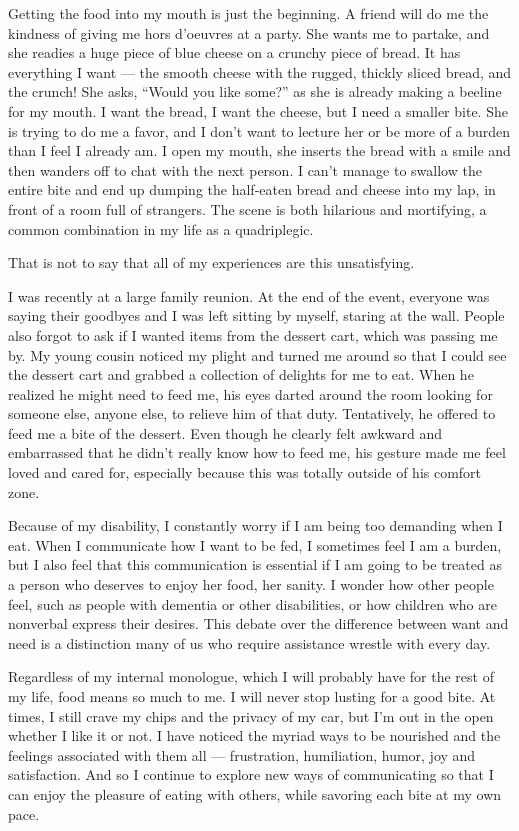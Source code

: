 Getting the food into my mouth is just the beginning. A friend will do
me the kindness of giving me hors d'oeuvres at a party. She wants me to
partake, and she readies a huge piece of blue cheese on a crunchy piece
of bread. It has everything I want --- the smooth cheese with the
rugged, thickly sliced bread, and the crunch! She asks, ``Would you like
some?'' as she is already making a beeline for my mouth. I want the
bread, I want the cheese, but I need a smaller bite. She is trying to do
me a favor, and I don't want to lecture her or be more of a burden than
I feel I already am. I open my mouth, she inserts the bread with a smile
and then wanders off to chat with the next person. I can't manage to
swallow the entire bite and end up dumping the half-eaten bread and
cheese into my lap, in front of a room full of strangers. The scene is
both hilarious and mortifying, a common combination in my life as a
quadriplegic.

That is not to say that all of my experiences are this unsatisfying.

I was recently at a large family reunion. At the end of the event,
everyone was saying their goodbyes and I was left sitting by myself,
staring at the wall. People also forgot to ask if I wanted items from
the dessert cart, which was passing me by. My young cousin noticed my
plight and turned me around so that I could see the dessert cart and
grabbed a collection of delights for me to eat. When he realized he
might need to feed me, his eyes darted around the room looking for
someone else, anyone else, to relieve him of that duty. Tentatively, he
offered to feed me a bite of the dessert. Even though he clearly felt
awkward and embarrassed that he didn't really know how to feed me, his
gesture made me feel loved and cared for, especially because this was
totally outside of his comfort zone.

Because of my disability, I constantly worry if I am being too demanding
when I eat. When I communicate how I want to be fed, I sometimes feel I
am a burden, but I also feel that this communication is essential if I
am going to be treated as a person who deserves to enjoy her food, her
sanity. I wonder how other people feel, such as people with dementia or
other disabilities, or how children who are nonverbal express their
desires. This debate over the difference between want and need is a
distinction many of us who require assistance wrestle with every day.

Regardless of my internal monologue, which I will probably have for the
rest of my life, food means so much to me. I will never stop lusting for
a good bite. At times, I still crave my chips and the privacy of my car,
but I'm out in the open whether I like it or not. I have noticed the
myriad ways to be nourished and the feelings associated with them all
--- frustration, humiliation, humor, joy and satisfaction. And so I
continue to explore new ways of communicating so that I can enjoy the
pleasure of eating with others, while savoring each bite at my own pace.

